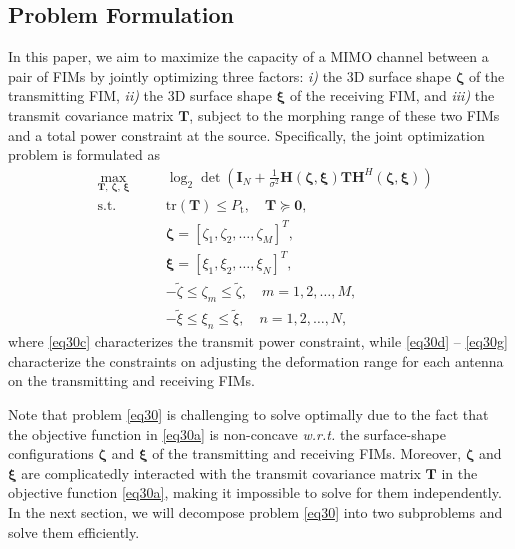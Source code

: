 \documentclass[lettersize,journal]{IEEEtran}
\begin{document}
\subsection{Problem Formulation}
In this paper, we aim to maximize the capacity of a MIMO channel between a pair of FIMs by jointly optimizing three factors: \emph{i)} the 3D surface shape $\boldsymbol{\zeta}$ of the transmitting FIM, \emph{ii)} the 3D surface shape $\boldsymbol{\xi}$ of the receiving FIM, and \emph{iii)} the transmit covariance matrix $\mathbf{T}$, subject to the morphing range of these two FIMs and a total power constraint at the source. Specifically, the joint optimization problem is formulated as
\begin{subequations}\label{eq30}
\begin{alignat}{2}
&\max_{\mathbf{T},\, \boldsymbol{\zeta},\, \boldsymbol{\xi}} &\quad& \log_{2}\det\left ( \mathbf{I}_{N}+\frac{1}{\sigma ^{2}}\mathbf{H}\left ( \boldsymbol{\zeta},\boldsymbol{\xi} \right )\mathbf{T}\mathbf{H}^{H}\left ( \boldsymbol{\zeta},\boldsymbol{\xi} \right ) \right ) \label{eq30a}\\
&\textrm{s.t.} & & \textrm{tr}\left ( \mathbf{T} \right )\leq P_{\textrm{t}},\quad \mathbf{T}\succeq \mathbf{0}, \label{eq30c}\\
& & & \boldsymbol{\zeta} =\left [ \zeta_{1}, \zeta_{2},\ldots , \zeta_{M} \right ]^{T}, \label{eq30d}\\
& & & \boldsymbol{\xi} =\left [ \xi_{1}, \xi_{2},\ldots , \xi_{N} \right ]^{T}, \label{eq30e}\\
& & & -\tilde{\zeta} \leq \zeta_{m}\leq \tilde{\zeta},\quad m=1,2,\ldots,M, \label{eq30f}\\
& & & -\tilde{\xi}\leq \xi_{n}\leq \tilde{\xi},\quad n=1,2,\ldots,N, \label{eq30g}
\end{alignat}
\end{subequations}
where \eqref{eq30c} characterizes the transmit power constraint, while \eqref{eq30d} -- \eqref{eq30g} characterize the constraints on adjusting the deformation range for each antenna on the transmitting and receiving FIMs.


Note that problem \eqref{eq30} is challenging to solve optimally due to the fact that the objective function in \eqref{eq30a} is non-concave \emph{w.r.t.} the surface-shape configurations $\boldsymbol{\zeta}$ and $\boldsymbol{\xi}$ of the transmitting and receiving FIMs. Moreover, $\boldsymbol{\zeta}$ and $\boldsymbol{\xi}$ are complicatedly interacted with the transmit covariance matrix $\mathbf{T}$ in the objective function \eqref{eq30a}, making it impossible to solve for them independently. In the next section, we will decompose problem \eqref{eq30} into two subproblems and solve them efficiently.
\end{document}
